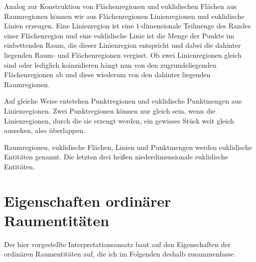         Analog zur Konstruktion von Flächenregionen und euklidischen Flächen aus Raumregionen können wir aus Flächenregionen Linienregionen und euklidische Linien erzeugen. 
        Eine Linienregion ist eine $1$-dimensionale Teilmenge des Randes einer Flächenregion und eine euklidische Linie ist die Menge der Punkte im einbettenden Raum, die dieser Linienregion entspricht und dabei die dahinter liegenden Raum- und Flächenregionen vergisst.
        Ob zwei Linienregionen gleich sind oder lediglich koinzidieren hängt nun von den zugrundeliegenden Flächenregionen ab und diese wiederum von den dahinter liegenden Raumregionen.

        Auf gleiche Weise entstehen Punktregionen und euklidische Punktmengen aus Linienregionen. 
        Zwei Punktregionen können nur gleich sein, wenn die Linienregionen, durch die sie erzeugt werden, ein gewisses Stück weit gleich aussehen, also überlappen.

        Raumregionen, euklidische Flächen, Linien und Punktmengen werden euklidische Entitäten genannt.
        Die letzten drei heißen niederdimensionale euklidische Entitäten.

    \section{Eigenschaften ordinärer Raumentitäten}\label{sec:zusammenfassung}
        Der hier vorgestellte Interpretationsansatz baut auf den Eigenschaften der ordinären Raumentitäten auf, die ich im Folgenden deshalb zusammenfasse.

